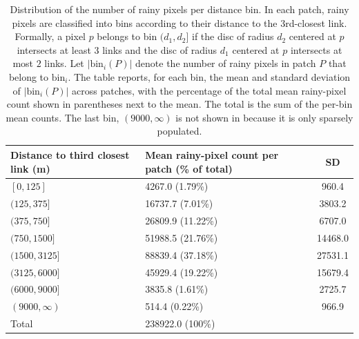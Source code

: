 \documentclass[11pt]{article}
\begin{document}
\begin{table}[H]
  \centering
    \begin{tabular}{l
                  l
                  S[table-format=5.1]}
    \toprule
    {Distance to third closest link (m)} & {Mean rainy-pixel count per patch (\% of total)} & {SD} \\
    \midrule
    $[0,125]$       & 4267.0 (1.79\%) &   960.4 \\
    $(125,375]$     & 16737.7 (7.01\%) &  3803.2 \\
    $(375,750]$     & 26809.9 (11.22\%) &  6707.0 \\
    $(750,1500]$    & 51988.5 (21.76\%) & 14468.0 \\
    $(1500,3125]$   & 88839.4 (37.18\%) & 27531.1 \\
    $(3125,6000]$   & 45929.4 (19.22\%) & 15679.4 \\
    $(6000,9000]$   & 3835.8 (1.61\%) &  2725.7 \\
    $(9000,\infty)$ & 514.4 (0.22\%) &   966.9 \\
    \midrule
    {Total}         & 238922.0 (100\%) & {} \\
    \bottomrule
  \end{tabular}
  \caption{Distribution of the number of rainy pixels per distance bin. In each patch, rainy pixels are classified into bins according to their distance to the 3rd-closest link. Formally, a pixel $p$ belongs to bin $(d_1,d_2]$ if the disc of radius $d_2$ centered at $p$ intersects at least $3$ links and the disc of radius $d_1$ centered at $p$ intersects at most $2$ links. Let $|\mathrm{bin}_i(P)|$ denote the number of rainy pixels in patch $P$ that belong to $\mathrm{bin}_i$. The table reports, for each bin, the mean and standard deviation of $|\mathrm{bin}_i(P)|$ across patches, with the percentage of the total mean rainy-pixel count shown in parentheses next to the mean. The total is the sum of the per-bin mean counts. The last bin, $(9000,\infty)$ is not shown in  because it is only sparsely populated.}
\end{table}
\end{document}
